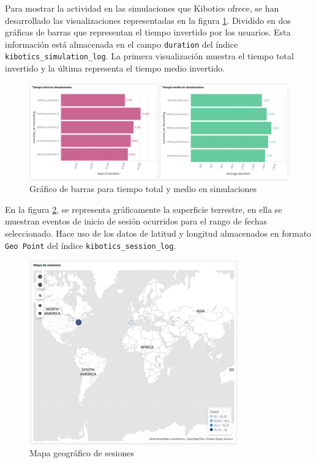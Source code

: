 \documentclass[11pt,a4paper]{book}
\begin{document}
				Para mostrar la actividad en las simulaciones que Kibotics ofrece, se han desarrollado las visualizaciones representadas en la figura \ref{fig:kibana_simulations}. Dividido en dos gráficas de barras que representan el tiempo invertido por los usuarios. Esta información está almacenada en el campo \texttt{duration} del índice \texttt{kibotics\_simulation\_log}. La primera visualización muestra el tiempo total invertido y la última representa el tiempo medio invertido.
				\begin{figure}[H]
					\centering
					\includegraphics[width=13cm, keepaspectratio]{img/kibana_05_simulations}
					\caption{Gráfico de barras para tiempo total y medio en simulaciones}
					\label{fig:kibana_simulations}
				\end{figure}

				En la figura \ref{fig:kibana_map}, se representa gráficamente la superficie terrestre, en ella se muestran eventos de inicio de sesión ocurridos para el rango de fechas seleccionado. Hace uso de los datos de latitud y longitud almacenados en formato \texttt{Geo Point} del índice \texttt{kibotics\_session\_log}.
				\begin{figure}[H]
					\centering
					\includegraphics[width=9cm, keepaspectratio]{img/kibana_06_map}
					\caption{Mapa geográfico de sesiones}
					\label{fig:kibana_map}
				\end{figure}
\end{document}
